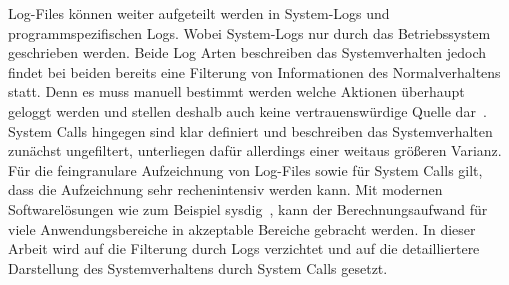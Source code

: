                 Log-Files können weiter aufgeteilt werden in System-Logs und programmspezifischen Logs.
                Wobei System-Logs nur durch das Betriebssystem geschrieben werden.
                Beide Log Arten beschreiben das Systemverhalten jedoch findet bei beiden bereits eine Filterung von Informationen des Normalverhaltens statt.
                Denn es muss manuell bestimmt werden welche Aktionen überhaupt geloggt werden und stellen deshalb auch keine vertrauenswürdige Quelle dar~\cite{SEMANTICSCREECH2014}.
                System Calls hingegen sind klar definiert und beschreiben das Systemverhalten zunächst ungefiltert, unterliegen dafür allerdings einer weitaus größeren Varianz.~\cite{HIDSSURVEY2019bridges}
                Für die feingranulare Aufzeichnung von Log-Files sowie für System Calls gilt, dass die Aufzeichnung sehr rechenintensiv werden kann.
                Mit modernen Softwarelösungen wie zum Beispiel sysdig~\cite{SYSDIG}, kann der Berechnungsaufwand für viele Anwendungsbereiche in akzeptable Bereiche gebracht werden.
                In dieser Arbeit wird auf die Filterung durch Logs verzichtet und auf die detailliertere Darstellung des Systemverhaltens durch System Calls gesetzt.


